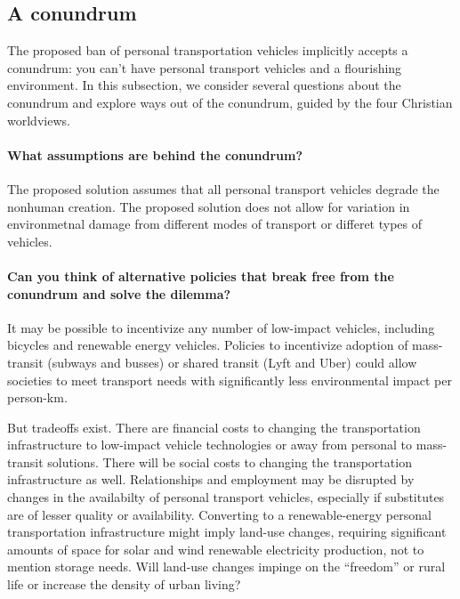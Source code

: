 \documentclass[12pt]{article}
\begin{document}
\subsection{A conundrum}
\label{sec:conundrum}

The proposed ban of personal transportation vehicles
implicitly accepts a conundrum: 
you can't have personal transport vehicles and a flourishing environment. 
In this subsection, we consider several questions about the conundrum and 
explore ways out of the conundrum,
guided by the four Christian worldviews.

\paragraph{What assumptions are behind the conundrum?} 

The proposed solution assumes that all personal transport vehicles degrade the nonhuman creation. 
The proposed solution does not allow for variation in environmetnal damage
from different modes of transport or differet types of vehicles.

\paragraph{Can you think of alternative policies that break free from the conundrum and solve the dilemma?} 

It may be possible to incentivize any number of low-impact vehicles, including 
bicycles and renewable energy vehicles.
Policies to incentivize adoption of 
mass-transit (subways and busses) or shared transit (Lyft and Uber)
could allow societies to meet transport needs with significantly less environmental impact 
per person-km.

But tradeoffs exist. 
There are financial costs to changing the transportation infrastructure to low-impact vehicle technologies
or away from personal to mass-transit solutions. 
There will be social costs to changing the transportation infrastructure as well.
Relationships and employment may be disrupted by changes in the availabilty of personal transport vehicles,
especially if substitutes are of lesser quality or availability.
Converting to a renewable-energy personal transportation infrastructure 
might imply land-use changes, 
requiring significant amounts of space for solar and wind renewable electricity production,
not to mention storage needs. 
Will land-use changes impinge on the ``freedom'' or rural life 
or increase the density of urban living?
\end{document}
